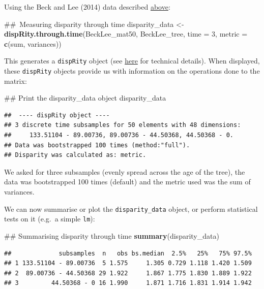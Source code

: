 \documentclass[]{book}
\newenvironment{Shaded}{\begin{snugshade}}{\end{snugshade}}
\newcommand{\KeywordTok}[1]{\textcolor[rgb]{0.13,0.29,0.53}{\textbf{#1}}}
\newcommand{\DataTypeTok}[1]{\textcolor[rgb]{0.13,0.29,0.53}{#1}}
\newcommand{\DecValTok}[1]{\textcolor[rgb]{0.00,0.00,0.81}{#1}}
\newcommand{\StringTok}[1]{\textcolor[rgb]{0.31,0.60,0.02}{#1}}
\newcommand{\NormalTok}[1]{#1}
\theoremstyle{definition}
\theoremstyle{definition}
\theoremstyle{remark}
\begin{document}
Using the Beck and Lee (2014) data described
\protect\hyperlink{example-data}{above}:

\begin{Shaded}
\begin{Highlighting}[]
\NormalTok{## Measuring disparity through time}
\NormalTok{disparity_data <-}\StringTok{ }\KeywordTok{dispRity.through.time}\NormalTok{(BeckLee_mat50, BeckLee_tree,}
                                        \DataTypeTok{time =} \DecValTok{3}\NormalTok{, }\DataTypeTok{metric =} \KeywordTok{c}\NormalTok{(sum, variances))}
\end{Highlighting}
\end{Shaded}

This generates a \texttt{dispRity} object (see
\protect\hyperlink{guts}{here} for technical details). When displayed,
these \texttt{dispRity} objects provide us with information on the
operations done to the matrix:

\begin{Shaded}
\begin{Highlighting}[]
\NormalTok{## Print the disparity_data object}
\NormalTok{disparity_data}
\end{Highlighting}
\end{Shaded}

\begin{verbatim}
##  ---- dispRity object ---- 
## 3 discrete time subsamples for 50 elements with 48 dimensions:
##     133.51104 - 89.00736, 89.00736 - 44.50368, 44.50368 - 0.
## Data was bootstrapped 100 times (method:"full").
## Disparity was calculated as: metric.
\end{verbatim}

We asked for three subsamples (evenly spread across the age of the
tree), the data was bootstrapped 100 times (default) and the metric used
was the sum of variances.

We can now summarise or plot the \texttt{disparity\_data} object, or
perform statistical tests on it (e.g.~a simple \texttt{lm}):

\begin{Shaded}
\begin{Highlighting}[]
\NormalTok{## Summarising disparity through time}
\KeywordTok{summary}\NormalTok{(disparity_data)}
\end{Highlighting}
\end{Shaded}

\begin{verbatim}
##             subsamples  n   obs bs.median  2.5%   25%   75% 97.5%
## 1 133.51104 - 89.00736  5 1.575     1.305 0.729 1.118 1.420 1.509
## 2  89.00736 - 44.50368 29 1.922     1.867 1.775 1.830 1.889 1.922
## 3         44.50368 - 0 16 1.990     1.871 1.716 1.831 1.914 1.942
\end{verbatim}
\end{document}
